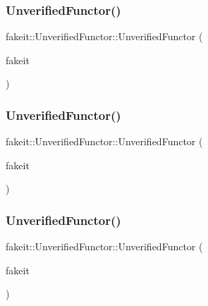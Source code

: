 \subsubsection{\texorpdfstring{UnverifiedFunctor()}{UnverifiedFunctor()}\hspace{0.1cm}{\footnotesize\ttfamily [1/9]}}
{\footnotesize\ttfamily fakeit\+::\+Unverified\+Functor\+::\+Unverified\+Functor (\begin{DoxyParamCaption}\item[{\mbox{\hyperlink{structfakeit_1_1FakeitContext}{Fakeit\+Context}} \&}]{fakeit }\end{DoxyParamCaption})\hspace{0.3cm}{\ttfamily [inline]}}

\mbox{\label{classfakeit_1_1UnverifiedFunctor_a5dcaec59e8d210db88b5600118e51426}} 
\subsubsection{\texorpdfstring{UnverifiedFunctor()}{UnverifiedFunctor()}\hspace{0.1cm}{\footnotesize\ttfamily [2/9]}}
{\footnotesize\ttfamily fakeit\+::\+Unverified\+Functor\+::\+Unverified\+Functor (\begin{DoxyParamCaption}\item[{\mbox{\hyperlink{structfakeit_1_1FakeitContext}{Fakeit\+Context}} \&}]{fakeit }\end{DoxyParamCaption})\hspace{0.3cm}{\ttfamily [inline]}}

\mbox{\label{classfakeit_1_1UnverifiedFunctor_a5dcaec59e8d210db88b5600118e51426}} 
\subsubsection{\texorpdfstring{UnverifiedFunctor()}{UnverifiedFunctor()}\hspace{0.1cm}{\footnotesize\ttfamily [3/9]}}
{\footnotesize\ttfamily fakeit\+::\+Unverified\+Functor\+::\+Unverified\+Functor (\begin{DoxyParamCaption}\item[{\mbox{\hyperlink{structfakeit_1_1FakeitContext}{Fakeit\+Context}} \&}]{fakeit }\end{DoxyParamCaption})\hspace{0.3cm}{\ttfamily [inline]}}

